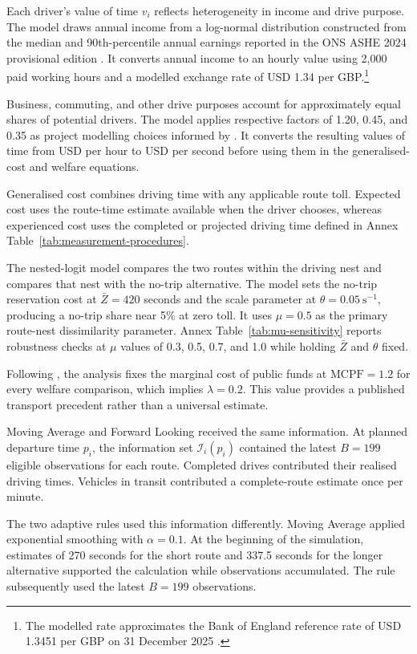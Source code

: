 \documentclass{article}
\begin{document}
Each driver's value of time $v_i$ reflects heterogeneity in income and drive purpose. The model draws annual income from a log-normal distribution constructed from the median and 90th-percentile annual earnings reported in the ONS ASHE 2024 provisional edition \parencite{ons2024}. It converts annual income to an hourly value using 2,000 paid working hours and a modelled exchange rate of USD 1.34 per GBP.\footnote{The modelled rate approximates the Bank of England reference rate of USD 1.3451 per GBP on 31 December 2025 \parencite{bankOfEngland2025}.}

Business, commuting, and other drive purposes account for approximately equal shares of potential drivers. The model applies respective factors of 1.20, 0.45, and 0.35 as project modelling choices informed by \textcite{wardmanEtAl2016}. It converts the resulting values of time from USD per hour to USD per second before using them in the generalised-cost and welfare equations.

Generalised cost combines driving time with any applicable route toll. Expected cost uses the route-time estimate available when the driver chooses, whereas experienced cost uses the completed or projected driving time defined in Annex Table~\ref{tab:measurement-procedures}.

The nested-logit model compares the two routes within the driving nest and compares that nest with the no-trip alternative. The model sets the no-trip reservation cost at $\bar Z=420$ seconds and the scale parameter at $\theta=0.05\ \mathrm{s}^{-1}$, producing a no-trip share near 5\% at zero toll. It uses $\mu=0.5$ as the primary route-nest dissimilarity parameter. Annex Table~\ref{tab:mu-sensitivity} reports robustness checks at $\mu$ values of 0.3, 0.5, 0.7, and 1.0 while holding $\bar Z$ and $\theta$ fixed.

Following \textcite{adlerEtAl2010}, the analysis fixes the marginal cost of public funds at $\mathrm{MCPF}=1.2$ for every welfare comparison, which implies $\lambda=0.2$. This value provides a published transport precedent rather than a universal estimate.

Moving Average and Forward Looking received the same information. At planned departure time $p_i$, the information set $\mathcal I_i(p_i)$ contained the latest $B=199$ eligible observations for each route. Completed drives contributed their realised driving times. Vehicles in transit contributed a complete-route estimate once per minute.

The two adaptive rules used this information differently. Moving Average applied exponential smoothing with $\alpha=0.1$. At the beginning of the simulation, estimates of 270 seconds for the short route and 337.5 seconds for the longer alternative supported the calculation while observations accumulated. The rule subsequently used the latest $B=199$ observations.
\end{document}
